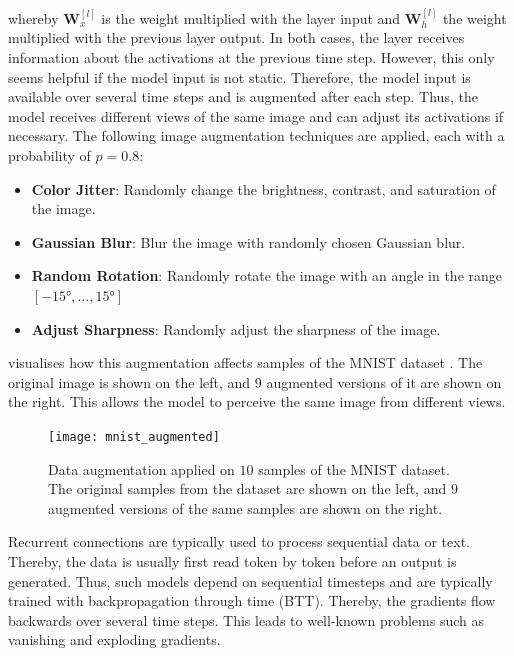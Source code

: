 whereby $\boldsymbol{W}_x^{[l]}$ is the weight multiplied with the layer input and $\boldsymbol{W}_h^{[l]}$ the weight multiplied with the previous layer output. In both cases, the layer receives information about the activations at the previous time step.
However, this only seems helpful if the model input is not static. Therefore, the model input is available over several time steps and is augmented after each step. Thus, the model receives different views of the same image and can adjust its activations if necessary. The following image augmentation techniques are applied, each with a probability of $p=0.8$:

\begin{itemize}
	\item \textbf{Color Jitter}: Randomly change the brightness, contrast, and saturation of the image.
	\item \textbf{Gaussian Blur}: Blur the image with randomly chosen Gaussian blur.
	\item \textbf{Random Rotation}: Randomly rotate the image with an angle in the range $[-15°, ..., 15°]$
	\item \textbf{Adjust Sharpness}: Randomly adjust the sharpness of the image.
\end{itemize}

 visualises how this augmentation affects samples of the MNIST dataset \cite{Lecun_Bottou_Bengio_Haffner_1998}. The original image is shown on the left, and $9$ augmented versions of it are shown on the right. This allows the model to perceive the same image from different views.

\begin{figure}[h]
    \centering
    \texttt{[image: mnist\_augmented]}
    \caption[Data augmentation applied on $10$ samples of the MNIST dataset]{Data augmentation applied on $10$ samples of the MNIST dataset. The original samples from the dataset are shown on the left, and $9$ augmented versions of the same samples are shown on the right.}
\end{figure}


Recurrent connections are typically used to process sequential data or text. Thereby, the data is usually first read token by token before an output is generated. Thus, such models depend on sequential timesteps and are typically trained with backpropagation through time (BTT). Thereby, the gradients flow backwards over several time steps. This leads to well-known problems such as vanishing and exploding gradients.

